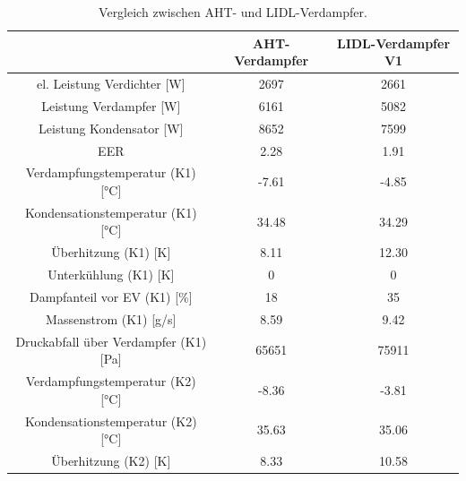 \begin{table}[h!]
\centering
\caption{Vergleich zwischen AHT- und LIDL-Verdampfer.}
\label{tab:Vergleichaltneu}
\begin{tabular}{|ccc|}
\hline
                                                                & AHT-Verdampfer      & LIDL-Verdampfer V1 \\ \hline
\multicolumn{1}{|c|}{el. Leistung Verdichter {[}W{]}}           & \multicolumn{1}{c|}{2697}  & 2661                   \\
\multicolumn{1}{|c|}{Leistung Verdampfer {[}W{]}}               & \multicolumn{1}{c|}{6161}  & 5082                   \\
\multicolumn{1}{|c|}{Leistung Kondensator {[}W{]}}             & \multicolumn{1}{c|}{8652}  & 7599                   \\
\multicolumn{1}{|c|}{EER}                                       & \multicolumn{1}{c|}{2.28}  & 1.91                   \\ \hline
\multicolumn{1}{|c|}{Verdampfungstemperatur (K1) {[}°C{]}}      & \multicolumn{1}{c|}{-7.61} & -4.85                  \\
\multicolumn{1}{|c|}{Kondensationstemperatur (K1) {[}°C{]}}    & \multicolumn{1}{c|}{34.48} & 34.29                  \\
\multicolumn{1}{|c|}{Überhitzung (K1) {[}K{]}}                  & \multicolumn{1}{c|}{8.11}  & 12.30                  \\
\multicolumn{1}{|c|}{Unterkühlung (K1) {[}K{]}}                 & \multicolumn{1}{c|}{0}     & 0                      \\
\multicolumn{1}{|c|}{Dampfanteil vor EV (K1) {[}\%{]}}          & \multicolumn{1}{c|}{18}    & 35                     \\
\multicolumn{1}{|c|}{Massenstrom (K1) {[}g/s{]}}                & \multicolumn{1}{c|}{8.59}  & 9.42                   \\
\multicolumn{1}{|c|}{Druckabfall über Verdampfer (K1) {[}Pa{]}} & \multicolumn{1}{c|}{65651} & 75911                  \\ \hline
\multicolumn{1}{|c|}{Verdampfungstemperatur (K2) {[}°C{]}}      & \multicolumn{1}{c|}{-8.36} & -3.81                  \\
\multicolumn{1}{|c|}{Kondensationstemperatur (K2) {[}°C{]}}    & \multicolumn{1}{c|}{35.63} & 35.06                  \\
\multicolumn{1}{|c|}{Überhitzung (K2) {[}K{]}}                  & \multicolumn{1}{c|}{8.33}  & 10.58                  \\

\end{tabular}
\end{table}
